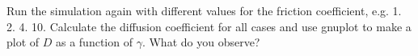 
Run the simulation again with different values for the friction
coefficient, e.g. 1. 2. 4. 10. Calculate the diffusion
coefficient for all cases and use gnuplot to make a plot of
$D$ as a function of $\gamma$. What do you observe?


